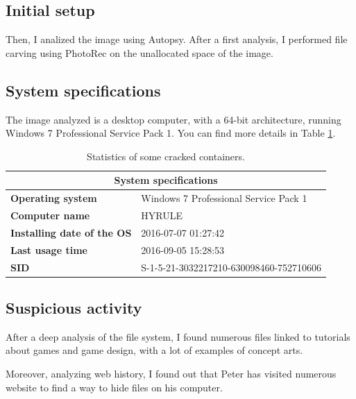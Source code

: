 \documentclass[12pt]{article}
\begin{document}
\subsection{Initial setup}


Then, I analized the image using Autopsy. After a first analysis, I performed file carving using PhotoRec on the unallocated space of the image.

\subsection{System specifications}

The image analyzed is a desktop computer, with a 64-bit architecture, running Windows 7 Professional Service Pack 1. 
You can find more details in Table \ref{table:stats}.

\begin{table}[!ht]
    \centering
    \begin{tabular}{ll}
    \toprule
        \multicolumn{2}{c}{\textbf{System specifications}} \\
        \midrule
        \textbf{Operating system} & Windows 7 Professional Service Pack 1 \\
        \textbf{Computer name} & HYRULE \\
        \textbf{Installing date of the OS} & 2016-07-07 01:27:42 \\
        \textbf{Last usage time} & 2016-09-05 15:28:53 \\
        \textbf{SID} & S-1-5-21-3032217210-630098460-752710606 \\
    \bottomrule
    \end{tabular}
    \caption{Statistics of some cracked containers.}
    \label{table:stats}
\end{table}

\subsection{Suspicious activity}

After a deep analysis of the file system, I found numerous files linked to tutorials about games and game design, with a lot of examples of concept arts. 

Moreover, analyzing web history, I found out that Peter has visited numerous website to find a way to hide files on his computer. 
\end{document}
